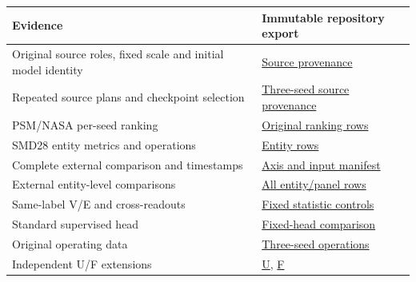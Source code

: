 \documentclass[
  english,
  9pt,
]{article}
\begin{document}
\begin{longtable}[]{@{}
  >{\raggedright\arraybackslash}p{}
  >{\raggedright\arraybackslash}p{}@{}}
\toprule\noalign{}
\begin{minipage}[b]{\linewidth}\raggedright
Evidence
\end{minipage} & \begin{minipage}[b]{\linewidth}\raggedright
Immutable repository export
\end{minipage} \\
\midrule\noalign{}
\endhead
\bottomrule\noalign{}
\endlastfoot
Original source roles, fixed scale and initial model identity &
\href{../../docs/experiments/native_event_rank_20261122/PROVENANCE.json}{Source
provenance} \\
Repeated source plans and checkpoint selection &
\href{../../docs/experiments/native_event_rank_repeats_20261122/source/source_provenance.json}{Three-seed
source provenance} \\
PSM/NASA per-seed ranking &
\href{../../docs/experiments/native_event_rank_repeats_20261122/ranking_by_seed.csv}{Original
ranking rows} \\
SMD28 entity metrics and operations &
\href{../../docs/experiments/native_event_smd28_20261123/native/entity_methods.csv}{Entity
rows} \\
Complete external comparison and timestamps &
\href{../../docs/experiments/native_endpoint_external_20261125/AXES_AND_INPUTS.json}{Axis
and input manifest} \\
External entity-level comparisons &
\href{../../docs/experiments/native_endpoint_external_20261125/entity_metrics.csv}{All
entity/panel rows} \\
Same-label V/E and cross-readouts &
\href{../../docs/experiments/native_e_vs_v_20261123/methods.csv}{Fixed
statistic controls} \\
Standard supervised head &
\href{../../docs/experiments/native_supervised_mlp_20261123/RESULTS.md}{Fixed-head
comparison} \\
Original operating data &
\href{../../docs/experiments/native_event_rank_repeats_20261122/operating_by_seed.csv}{Three-seed
operations} \\
Independent U/F extensions &
\href{../../docs/experiments/native_event_stage2_u_20261123/RESULTS.md}{U},
\href{../../docs/experiments/native_event_stage2_f_20261123/RESULTS.md}{F} \\
\end{longtable}
\end{document}
